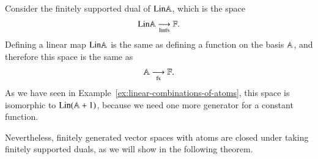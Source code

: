 \begin{myexample}
    Consider the finitely supported dual of $\mathrm{Lin} \mathbb A$, which is the space
    \begin{align*}
    \mathrm{Lin} \mathbb A \underset{\text{linfs}}{\longrightarrow} \mathbb F.
    \end{align*}
    Defining a linear map $\mathrm{Lin} \mathbb A$ is the same as defining a function on the basis $\mathbb A$, and therefore this space is the same as 
    \begin{align*}
    \mathbb A \underset{\text{fs}}{\longrightarrow} \mathbb F.
    \end{align*}
    As we have seen in Example~\ref{ex:linear-combinations-of-atoms}, this space is  isomorphic to $\mathrm{Lin} (\mathbb A +1)$, because we need one more generator for a constant function. 
\end{myexample}

Nevertheless, finitely generated vector spaces with atoms are closed under taking finitely supported duals, as we will show in the following theorem.




